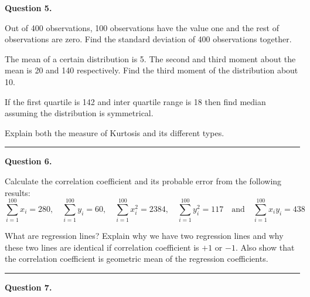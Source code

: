 \documentclass[11pt,a4paper]{article}
\begin{document}
\noindent   \textbf{Question 5.}

\begin{parts}
  \item Out of 400 observations, 100 observations have the value one and the rest of observations are zero. Find the standard deviation of 400 observations together.

  \item The mean of a certain distribution is 5. The second and third moment about the mean is 20 and 140 respectively. Find the third moment of the distribution about 10.

  \item If the first quartile is 142 and inter quartile range is 18 then find median assuming the distribution is symmetrical.

  \item Explain both the measure of Kurtosis and its different types.
\end{parts}

\medskip\rule{\linewidth}{0.2pt}\medskip




\noindent   \textbf{Question 6.}

\begin{parts}
  \item Calculate the correlation coefficient and its probable error from the following results:
  \[ \sum_{i=1}^{100} x_i = 280, \quad \sum_{i=1}^{100} y_i = 60, \quad \sum_{i=1}^{100} x_i^2 = 2384, \quad \sum_{i=1}^{100} y_i^2 = 117 \quad  \text{and} \quad \sum_{i=1}^{100} x_i y_i = 438 \]

  \item What are regression lines? Explain why we have two regression lines and why these two lines are identical if correlation coefficient is $+1$ or $-1$. Also show that the correlation coefficient is geometric mean of the regression coefficients.
\end{parts}

\medskip\rule{\linewidth}{0.2pt}\medskip




\noindent   \textbf{Question 7.}
\end{document}
